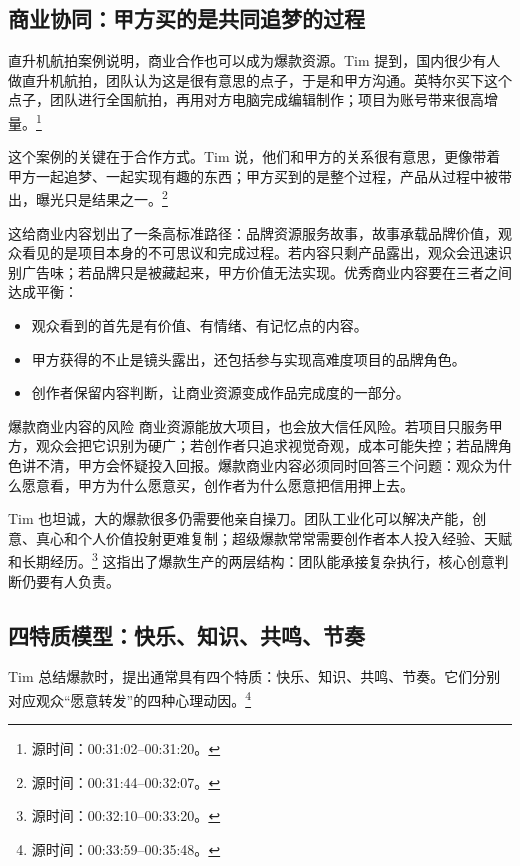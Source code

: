 \subsection{商业协同：甲方买的是共同追梦的过程}

直升机航拍案例说明，商业合作也可以成为爆款资源。Tim 提到，国内很少有人做直升机航拍，团队认为这是很有意思的点子，于是和甲方沟通。英特尔买下这个点子，团队进行全国航拍，再用对方电脑完成编辑制作；项目为账号带来很高增量。\footnote{源时间：00:31:02--00:31:20。}

这个案例的关键在于合作方式。Tim 说，他们和甲方的关系很有意思，更像带着甲方一起追梦、一起实现有趣的东西；甲方买到的是整个过程，产品从过程中被带出，曝光只是结果之一。\footnote{源时间：00:31:44--00:32:07。}

这给商业内容划出了一条高标准路径：品牌资源服务故事，故事承载品牌价值，观众看见的是项目本身的不可思议和完成过程。若内容只剩产品露出，观众会迅速识别广告味；若品牌只是被藏起来，甲方价值无法实现。优秀商业内容要在三者之间达成平衡：

\begin{itemize}
  \item 观众看到的首先是有价值、有情绪、有记忆点的内容。
  \item 甲方获得的不止是镜头露出，还包括参与实现高难度项目的品牌角色。
  \item 创作者保留内容判断，让商业资源变成作品完成度的一部分。
\end{itemize}

\begin{warningbox}{爆款商业内容的风险}
商业资源能放大项目，也会放大信任风险。若项目只服务甲方，观众会把它识别为硬广；若创作者只追求视觉奇观，成本可能失控；若品牌角色讲不清，甲方会怀疑投入回报。爆款商业内容必须同时回答三个问题：观众为什么愿意看，甲方为什么愿意买，创作者为什么愿意把信用押上去。
\end{warningbox}

Tim 也坦诚，大的爆款很多仍需要他亲自操刀。团队工业化可以解决产能，创意、真心和个人价值投射更难复制；超级爆款常常需要创作者本人投入经验、天赋和长期经历。\footnote{源时间：00:32:10--00:33:20。} 这指出了爆款生产的两层结构：团队能承接复杂执行，核心创意判断仍要有人负责。

\subsection{四特质模型：快乐、知识、共鸣、节奏}

Tim 总结爆款时，提出通常具有四个特质：快乐、知识、共鸣、节奏。它们分别对应观众“愿意转发”的四种心理动因。\footnote{源时间：00:33:59--00:35:48。}

